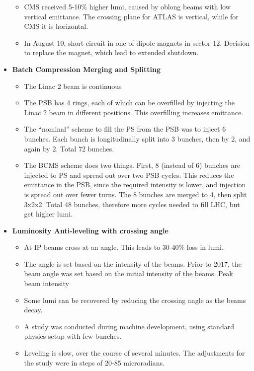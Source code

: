 \begin{itemize}
\begin{itemize}
        \item CMS received 5-10\% higher lumi, caused by oblong beams with low vertical emittance. The crossing plane for ATLAS is vertical, while for CMS it is horizontal. \cite{lhcRun2}
        \item In August 10, short circuit in one of dipole magnets in sector 12. Decision to replace the magnet, which lead to extended shutdown. \cite{lhcRun2}
    \end{itemize}
    \item \textbf{Batch Compression Merging and Splitting}
    \begin{itemize}\scriptsize
        \item The Linac 2 beam is continuous \cite{freyermuth}
        \item The PSB has 4 rings, each of which can be overfilled by injecting the Linac 2 beam in different positions. This overfilling increases emittance. \cite{freyermuth}
        \item The ``nominal'' scheme to fill the PS from the PSB was to inject 6 bunches. Each bunch is longitudinally split into 3 bunches, then by 2, and again by 2. Total 72 bunches. \cite{freyermuth}
        \item The BCMS scheme does two things. First, 8 (instead of 6) bunches are injected to PS and spread out over two PSB cycles. This reduces the emittance in the PSB, since the required intensity is lower, and injection is spread out over fewer turns. The 8 bunches are merged to 4, then split 3x2x2. Total 48 bunches, therefore more cycles needed to fill LHC, but get higher lumi. \cite{freyermuth}
    \end{itemize}
    \item \textbf{Luminosity Anti-leveling with crossing angle}
    \begin{itemize}\scriptsize
        \item At IP beams cross at an angle. This leads to 30-40\% loss in lumi. \cite{gorzawski}
        \item The angle is set based on the intensity of the beams. Prior to 2017, the beam angle was set based on the initial intensity of the beams. Peak beam intensity \cite{gorzawski}
        \item Some lumi can be recovered by reducing the crossing angle as the beams decay.  \cite{gorzawski}
        \item A study was conducted during machine development, using standard physics setup with few bunches. \cite{gorzawski}
        \item Leveling is slow, over the course of several minutes. The adjustments for the study were in steps of 20-85 microradians. \cite{gorzawski}

\end{itemize}
\end{itemize}
